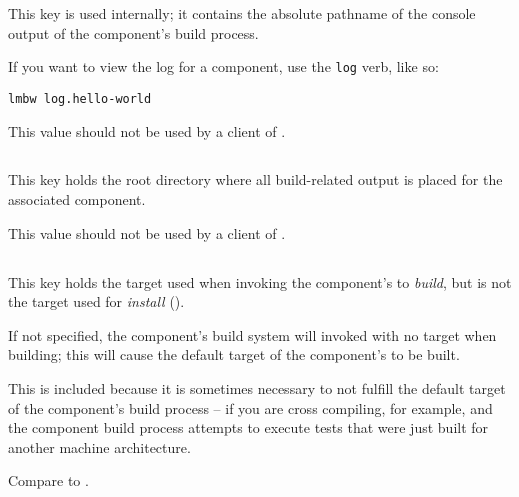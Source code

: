 This key is used internally; it contains the absolute pathname of the
console output of the component's build process.

If you want to view the log for a component, use the \texttt{log}
verb, like so:

\begin{verbatim}
lmbw log.hello-world
\end{verbatim}

This value should not be used by a client of \lmsbw.


\subsection{}\label{variables:build-root-directory}

This key holds the root directory where all build-related output is
placed for the associated component.

This value should not be used by a client of \lmsbw.


\subsection{}\label{variables:build-target}

This key holds the target used when invoking the component's \makefile
to \emph{build}, but is not the target used for \emph{install}
().

If not specified, the component's build system will invoked with no
target when building; this will cause the default target of the
component's \makefile to be built.

This is included because it is sometimes necessary to not fulfill the
default target of the component's build process -- if you are cross
compiling, for example, and the component build process attempts to
execute tests that were just built for another machine architecture.

Compare to .

\label{variables:build-target}

\subsection{}\label{variables:cflags}


